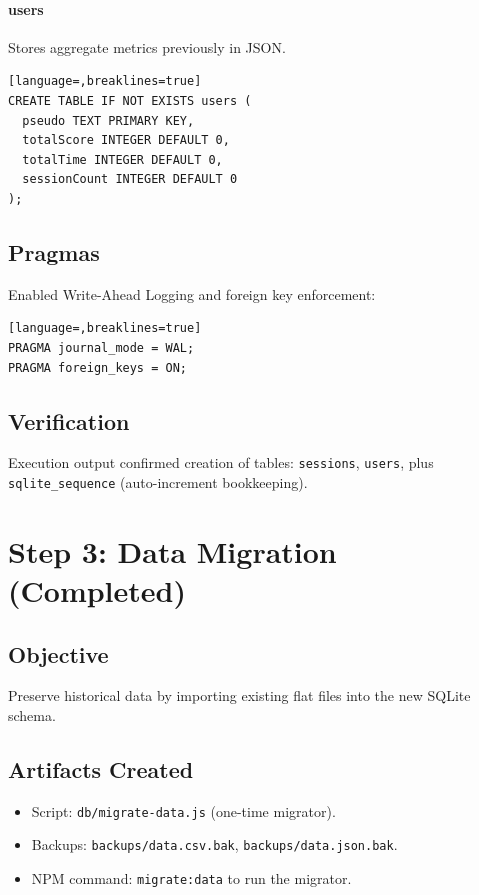 \documentclass[11pt,a4paper]{article}
\begin{document}
\paragraph{users}
Stores aggregate metrics previously in JSON.
\begin{lstlisting}[language=,breaklines=true]
CREATE TABLE IF NOT EXISTS users (
  pseudo TEXT PRIMARY KEY,
  totalScore INTEGER DEFAULT 0,
  totalTime INTEGER DEFAULT 0,
  sessionCount INTEGER DEFAULT 0
);
\end{lstlisting}

\subsection{Pragmas}
Enabled Write-Ahead Logging and foreign key enforcement:
\begin{lstlisting}[language=,breaklines=true]
PRAGMA journal_mode = WAL;
PRAGMA foreign_keys = ON;
\end{lstlisting}

\subsection{Verification}
Execution output confirmed creation of tables: \texttt{sessions}, \texttt{users}, plus \texttt{sqlite\_sequence} (auto-increment bookkeeping).

\section{Step 3: Data Migration (Completed)}
\subsection{Objective}
Preserve historical data by importing existing flat files into the new SQLite schema.

\subsection{Artifacts Created}
\begin{itemize}[noitemsep]
  \item Script: \texttt{db/migrate-data.js} (one-time migrator).
  \item Backups: \texttt{backups/data.csv.bak}, \texttt{backups/data.json.bak}.
  \item NPM command: \texttt{migrate:data} to run the migrator.
\end{itemize}
\end{document}

